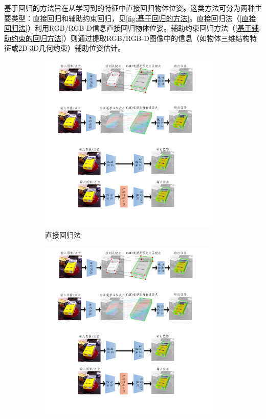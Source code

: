 \par 基于回归的方法旨在从学习到的特征中直接回归物体位姿。这类方法可分为两种主要类型：直接回归和辅助约束回归，见\autoref{fig:基于回归的方法}。直接回归法（\autoref{直接回归法}）利用RGB/RGB-D信息直接回归物体位姿。辅助约束回归方法（\autoref{基于辅助约束的回归方法}）则通过提取RGB/RGB-D图像中的信息（如物体三维结构特征或2D-3D几何约束）辅助位姿估计。

\begin{figure}[htbp]
    \centering
    \begin{subfigure}[b]{0.95\textwidth}
        \centering
        \includegraphics[width=0.95\textwidth]{figure/intro/直接回归法.pdf}
        \caption{直接回归法}
        \label{fig:直接回归法}
    \end{subfigure}
    \vfill
    \begin{subfigure}[b]{0.95\textwidth}
        \centering
        \includegraphics[width=0.95\textwidth]{figure/intro/辅助约束回归方法.pdf}

\end{subfigure}
\end{figure}

